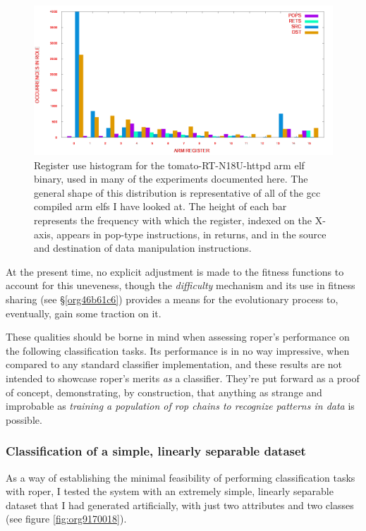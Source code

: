 \documentclass[12pt,glossary]{dalthesis}
\begin{document}
\begin{figure}[htbp]
\centering
\includegraphics[width=.9\linewidth]{../images/plots/tomato-register-histogram.png}
\caption{\label{fig:org287f23d}
Register use histogram for the tomato-RT-N18U-httpd \gls{arm} \gls{elf} binary, used in many of the experiments documented here. The general shape of this distribution is representative of all of the \gls{gcc} compiled \gls{arm} \glspl{elf} I have looked at. The height of each bar represents the frequency with which the register, indexed on the X-axis, appears in pop-type instructions, in returns, and in the source and destination of data manipulation instructions.}
\end{figure}

At the present time, no explicit adjustment is made to the fitness functions
to account for this uneveness, though the \emph{difficulty} mechanism and its use in
fitness sharing (see \S \ref{org46b61c6}) provides a means for the evolutionary
process to, eventually, gain some traction on it.

These qualities should be borne in mind when assessing \gls{roper}'s performance
on the following classification tasks. Its performance is in no way impressive,
when compared to any standard classifier implementation, and these results are
not intended to showcase \gls{roper}'s merits \emph{as} a classifier. They're put
forward as a proof of concept, demonstrating, by construction, that anything as
strange and improbable as \emph{training a population of \gls{rop} chains to recognize
patterns in data} is possible.

\subsubsection{Classification of a simple, linearly separable dataset}
\label{sec:orgfd865f1}
\label{org27e5c1b}

As a way of establishing the minimal feasibility of performing classification
tasks with \gls{roper}, I tested the system with an extremely simple, linearly
separable dataset that I had generated artificially, with just two attributes
and two classes (see figure \ref{fig:org9170018}).
\end{document}
